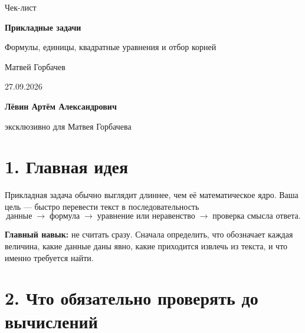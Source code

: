 \documentclass[a4paper,12pt]{article}
\newcommand{\sectionline}{\par\vspace{0.3em}{\color{accent}\hrule height 0.7pt}\vspace{0.7em}}
\newcommand{\key}[1]{\textbf{\color{darkaccent}#1}}
\begin{document}
\begin{titlepage}
\thispagestyle{empty}
\centering
\vspace*{22mm}

{\Large\color{softgray}Чек-лист\par}
\vspace{8mm}
{\Huge\bfseries\color{darkaccent}Прикладные задачи\par}
\vspace{3mm}
{\Large\color{textgray}Формулы, единицы, квадратные уравнения и отбор корней\par}

\vspace{18mm}
{\large Матвей Горбачев\par}
\vspace{3mm}
{\normalsize 27.09.2026\par}

\vfill
{\large\bfseries\color{darkaccent}Лёвин Артём Александрович\par}
\vspace{2mm}
{\normalsize эксклюзивно для Матвея Горбачева\par}

\vspace{12mm}
\end{titlepage}

\section*{1. Главная идея}
\sectionline

Прикладная задача обычно выглядит длиннее, чем её математическое ядро. Ваша цель --- быстро перевести текст в последовательность
\[
\text{данные}
\;\longrightarrow\;
\text{формула}
\;\longrightarrow\;
\text{уравнение или неравенство}
\;\longrightarrow\;
\text{проверка смысла ответа}.
\]

\key{Главный навык:} не считать сразу. Сначала определить, что обозначает каждая величина, какие данные даны явно, какие приходится извлечь из текста, и что именно требуется найти.

\section*{2. Что обязательно проверять до вычислений}
\sectionline
\end{document}
